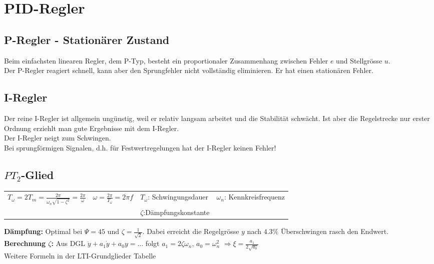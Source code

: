 \section{PID-Regler }

	\subsection{P-Regler - Stationärer Zustand }
		Beim einfachsten linearen Regler, dem P-Typ, besteht ein proportionaler
		Zusammenhang zwischen Fehler $e$ und Stellgrösse $u$.\\
		Der P-Regler reagiert schnell, kann aber den Sprungfehler nicht vollständig
		eliminieren. Er hat einen stationären Fehler.
		
	
	\subsection{I-Regler }
		Der reine I-Regler ist allgemein ungünstig, weil er relativ langsam arbeitet
		und die Stabilität schwächt. Ist aber die Regelstrecke nur erster Ordnung
		erziehlt man gute Ergebnisse mit dem I-Regler.\\
		Der I-Regler neigt zum Schwingen.\\
		Bei sprungförmigen Signalen, d.h. für Festwertregelungen hat der I-Regler
		keinen Fehler!
		
	
	\subsection{$PT_2$-Glied }
		\begin{tabular}{p{5cm}p{3cm}p{4cm}p{4cm}}
			$T_\omega = 2T_m=\frac{2\pi}{\omega_n \sqrt{1-\zeta^2}}=\frac{2\pi}{\omega}$ & $\omega = \frac{2\pi}{T_\omega}=2\pi f$ &  $T_\omega$: Schwingungsdauer & $\omega_n$: Kennkreisfrequenz\\
			& & $\zeta$:Dämpfungskonstante &
		\end{tabular}

		\textbf{Dämpfung:} Optimal bei $\Psi=45$ und $\zeta=\frac{1}{\sqrt{2}}$.
		Dabei erreicht die Regelgrösse $y$ nach $4.3\%$ Überschwingen rasch den	Endwert.\\
		\textbf{Berechnung $\zeta$:} Aus DGL $\ddot{y}+a_1\dot{y}+a_0 y=\ldots$ folgt $a_1=2\zeta\omega_n$, $a_0=\omega_n^2$ $\Rightarrow \xi=\frac{a_1}{2\sqrt{a_0}}$ \\
		Weitere Formeln in der LTI-Grundglieder Tabelle
	
